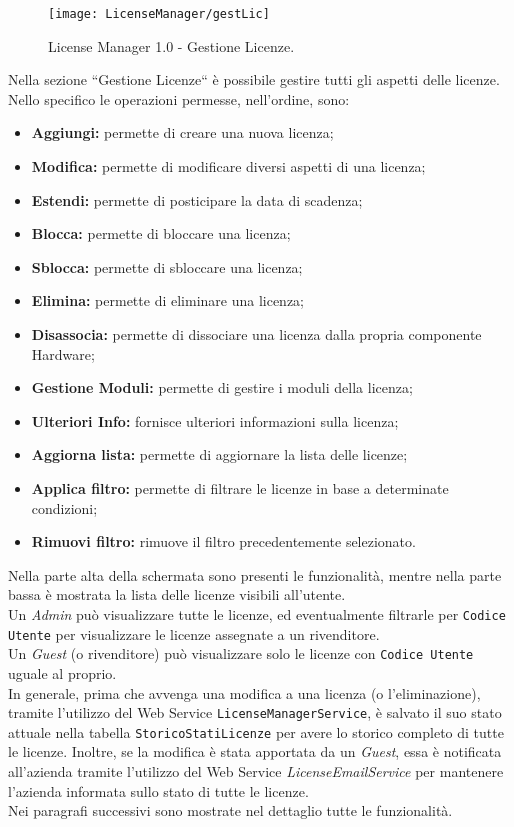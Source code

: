 \begin{figure}[!h] 
    \centering 
    \texttt{[image: LicenseManager/gestLic]} 
    \caption{License Manager 1.0 - Gestione Licenze.}
\label{gestLic}
\end{figure}

Nella sezione “Gestione Licenze“ è possibile gestire tutti gli aspetti delle licenze.
Nello specifico le operazioni permesse, nell'ordine, sono:
\begin{itemize}
\item \textbf{Aggiungi:} permette di creare una nuova licenza;
\item \textbf{Modifica:} permette di modificare diversi aspetti di una licenza;
\item \textbf{Estendi:} permette di posticipare la data di scadenza;
\item \textbf{Blocca:} permette di bloccare una licenza;
\item \textbf{Sblocca:} permette di sbloccare una licenza;
\item \textbf{Elimina:} permette di eliminare una licenza;
\item \textbf{Disassocia:} permette di dissociare una licenza dalla propria componente Hardware;
\item \textbf{Gestione Moduli:} permette di gestire i moduli della licenza;
\item \textbf{Ulteriori Info:} fornisce ulteriori informazioni sulla licenza;
\item \textbf{Aggiorna lista:} permette di aggiornare la lista delle licenze;
\item \textbf{Applica filtro:} permette di filtrare le licenze in base a determinate condizioni;
\item \textbf{Rimuovi filtro:} rimuove il filtro precedentemente selezionato.
\end{itemize} 
Nella parte alta della schermata sono presenti le funzionalità, mentre nella parte bassa è mostrata la lista delle licenze visibili all’utente.
\\
Un \textit{Admin} può visualizzare tutte le licenze, ed eventualmente filtrarle per \texttt{Codice Utente} per visualizzare le licenze assegnate a un rivenditore.
\\
Un \textit{Guest} (o rivenditore) può visualizzare solo le licenze con \texttt{Codice Utente} uguale al proprio.
\\

In generale, prima che avvenga una modifica a una licenza (o l'eliminazione), tramite l'utilizzo del Web Service \texttt{LicenseManagerService}, è salvato il suo stato attuale nella tabella \texttt{StoricoStatiLicenze} per avere lo storico completo di tutte le licenze. Inoltre, se la modifica è stata apportata da un \textit{Guest}, essa è notificata all'azienda tramite l'utilizzo del Web Service \textit{LicenseEmailService} per mantenere l'azienda informata sullo stato di tutte le licenze. 
\\Nei paragrafi successivi sono mostrate nel dettaglio tutte le funzionalità. 

